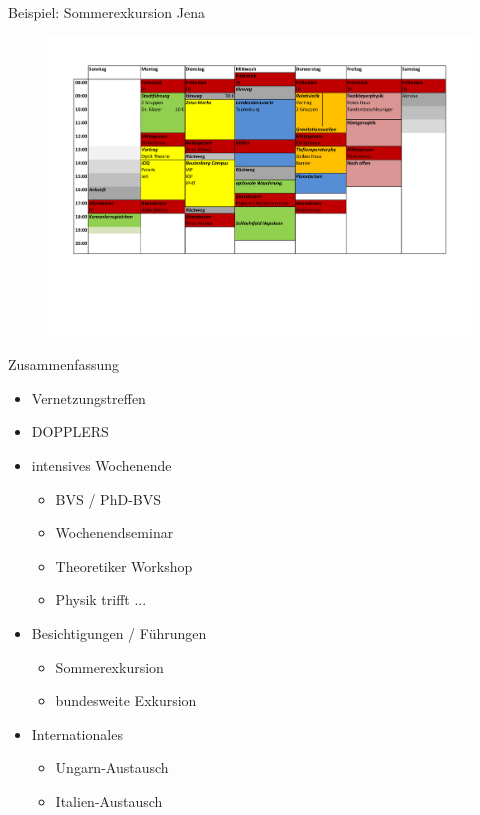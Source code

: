 \documentclass[
]{beamer}
\begin{document}
\begin{frame}{Beispiel: Sommerexkursion Jena}
  \begin{figure}
   \centering
   \includegraphics[width=\textwidth]{figure/programm_soex-jena}
  \end{figure}
\end{frame}


\begin{frame}{Zusammenfassung}
  \begin{itemize}
    \item Vernetzungstreffen
    \item DOPPLERS
    \item intensives Wochenende
    \begin{itemize}
      \item BVS / PhD-BVS
      \item Wochenendseminar
      \item Theoretiker Workshop
      \item Physik trifft ...
    \end{itemize}
    \item Besichtigungen / Führungen 
    \begin{itemize}
      \item Sommerexkursion
      \item bundesweite Exkursion
    \end{itemize}
    \item Internationales
    \begin{itemize}
      \item Ungarn-Austausch
      \item Italien-Austausch
    \end{itemize}
  \end{itemize}
\end{frame}
\end{document}
